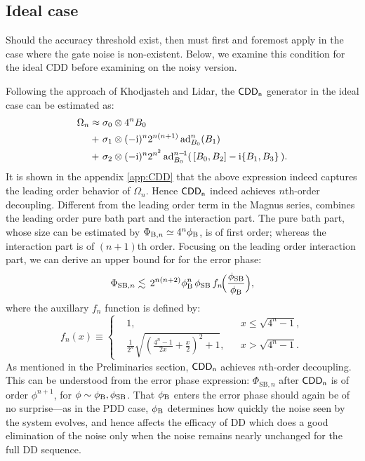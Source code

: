 \documentclass[b5paper,11pt]{article}
\newcommand{\CDDn}{\textsf{CDD\textsubscript{n}}}
\begin{document}
\subsection{Ideal case}
Should the accuracy threshold exist, then  must first and foremost apply in the case where the gate noise is non-existent. 
 Below, we examine this condition for the ideal CDD before examining on the noisy version.

Following the approach of Khodjasteh and Lidar, the $\CDDn$ generator in the ideal case can be estimated as:
\begin{align}\label{eq:cdd-generator-est}
\Omega_{n} 
\approx {} & \sigma_0 \otimes 4^n B_0 \notag \\
+\ & \sigma_1 \otimes (-\mathrm{i})^{n} 2^{n(n+1)} \operatorname{ad}_{B_0}^{n}(B_1)\\ 
+\ & \sigma_2 \otimes (-\mathrm{i})^{n} 2^{n^2} \operatorname{ad}_{B_0}^{n-\!1}( \,[B_0,B_2] - \mathrm{i} \{B_1,B_3\} \,). \notag
\end{align} 
It is shown in the appendix \ref{app:CDD}   that the above expression indeed captures the leading order behavior of $\Omega_{n}$. Hence $\CDDn$ indeed achieves $n$th-order decoupling. Different from the leading order term in the Magnus series,  combines the leading order pure bath part and the interaction part. 
The pure bath part, whose size can be estimated by $\Phi_{\mathrm{B},n} \simeq 4^n\phi_{\mathrm{B}}$, is of first order; whereas the interaction part is of $(n+1)$th order. 
Focusing on the leading order interaction part, we can derive an upper bound for for the error phase: 
\begin{equation}\label{eq:CDDerrph-ub}
\Phi_{\mathrm{SB},n} \lesssim \,
2^{n(n+2)} \phi_{\mathrm{B}}^{n}\,\phi_{\mathrm{SB}} \,f_n\!\Bigl(\frac{\phi_{\mathrm{SB}}}{\phi_{\mathrm{B}}}\Bigr),
\end{equation}
where the auxillary $f_n$ function is defined by:
\begin{equation}
 f_n(x) \equiv\left\{
 \begin{aligned}
 &1, && x \le  \sqrt{4^n-1}, \\
 &\frac{1}{2^n} \sqrt{\left(\frac{4^n-1}{2x}+\frac{x}{2}\right)^2+1}, &&
 x > \sqrt{4^n-1}.
 \end{aligned}
 \right.
\end{equation}
As mentioned in the Preliminaries section, $\CDDn$ achieves $n$th-order decoupling. This can be understood from the error phase expression: $\Phi_{\mathrm{SB},n}$ after $\CDDn$ is of order $\phi^{n+1}$, for $\phi\sim\phi_{\mathrm{B}}, \phi_{\mathrm{SB}}$. That $\phi_{\mathrm{B}}$ enters the error phase should again be of no surprise---as in the PDD case, $\phi_{\mathrm{B}}$ determines how quickly the noise seen by the system evolves, and hence affects the efficacy of DD which does a good elimination of the noise only when the noise remains nearly unchanged for the full DD sequence. 
\end{document}

